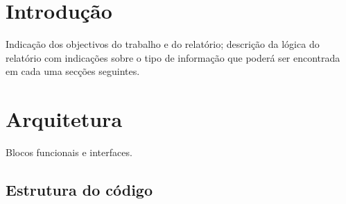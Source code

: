 \documentclass[a4paper]{article}
\begin{document}

\newpage

%
%
%
%
%
%
%


\section{Introdução}

Indicação dos objectivos do trabalho e do relatório; descrição da lógica do relatório com indicações sobre o tipo de informação que poderá ser encontrada em cada uma secções seguintes.


\section{Arquitetura}

Blocos funcionais e interfaces.

\subsection{Estrutura do código}
\end{document}

